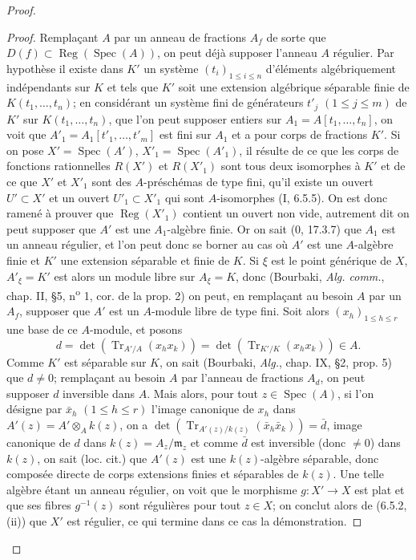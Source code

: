 \begin{proof}
\begin{proof}
Remplaçant $A$ par un anneau de fractions $A_f$ de sorte que
$D(f)\subset\operatorname{Reg}(\operatorname{Spec}(A))$, on peut déjà
supposer l'anneau $A$ régulier. Par hypothèse il existe dans $K'$ un système
$(t_i)_{1\leq i\leq n}$ d'éléments algébriquement indépendants sur $K$ et
tels que $K'$ soit une extension algébrique séparable finie de
$K(t_1,\ldots,t_n)$; en considérant un système fini
de générateurs $t'_j$ $(1\leq j\leq m)$ de $K'$ sur
$K(t_1,\ldots,t_n)$, que l'on peut supposer entiers sur
$A_1=A[t_1,\ldots,t_n]$, on voit que
$A'_1=A_1[t'_1,\ldots,t'_m]$ est fini sur $A_1$ et a pour corps de fractions
$K'$. Si on pose $X'=\operatorname{Spec}(A')$,
$X'_1=\operatorname{Spec}(A'_1)$, il résulte de ce que les corps de fonctions
rationnelles $R(X')$ et $R(X'_1)$ sont tous deux isomorphes à $K'$ et de ce
que $X'$ et $X'_1$ sont des $A$-préschémas de type fini, qu'il existe un
ouvert $U'\subset X'$ et un ouvert $U'_1\subset X'_1$ qui sont
$A$-isomorphes (I, 6.5.5). On est donc ramené à prouver que
$\operatorname{Reg}(X'_1)$ contient un ouvert non vide, autrement dit on
peut supposer que $A'$ est une $A_1$-algèbre finie. Or on sait (0, 17.3.7)
que $A_1$ est un anneau régulier, et l'on peut donc se borner au cas où $A'$
est une $A$-algèbre finie et $K'$ une extension séparable et finie de $K$.
Si $\xi$ est le point générique de $X$, $A'_\xi=K'$ est alors un module
libre sur $A_\xi=K$, donc (Bourbaki, \emph{Alg. comm.}, chap. II, \S5,
n\textsuperscript{o} 1,
cor. de la prop. 2) on peut, en remplaçant au besoin $A$ par un $A_f$,
supposer que $A'$ est un $A$-module libre de type fini. Soit alors
$(x_h)_{1\leq h\leq r}$ une base de ce $A$-module, et posons
\[
d=\det(\operatorname{Tr}_{A'/A}(x_hx_k))=
\det(\operatorname{Tr}_{K'/K}(x_hx_k))\in A.
\]
Comme $K'$ est séparable sur $K$, on sait (Bourbaki, \emph{Alg.}, chap. IX, \S2,
prop. 5) que $d\neq0$; remplaçant au besoin $A$ par l'anneau de fractions
$A_d$, on peut supposer $d$ inversible dans $A$. Mais alors, pour tout
$z\in\operatorname{Spec}(A)$, si l'on désigne par $\bar x_h$
$(1\leq h\leq r)$ l'image canonique de $x_h$ dans
$A'(z)=A'\otimes_A k(z)$, on a
$\det(\operatorname{Tr}_{A'(z)/k(z)}(\bar x_h\bar x_k))=\bar d$, image
canonique de $d$ dans $k(z)=A_z/\mathfrak m_z$ et comme $\bar d$ est
inversible (donc $\neq0$) dans $k(z)$, on sait (loc. cit.) que $A'(z)$ est
une $k(z)$-algèbre séparable, donc composée directe de corps extensions
finies et séparables de $k(z)$. Une telle algèbre étant un anneau régulier,
on voit que le morphisme $g:X'\to X$ est plat et que ses fibres $g^{-1}(z)$
sont régulières pour tout $z\in X$; on conclut alors de (6.5.2, (ii)) que
$X'$ est régulier, ce qui termine dans ce cas la démonstration.
\end{proof}


\end{proof}
